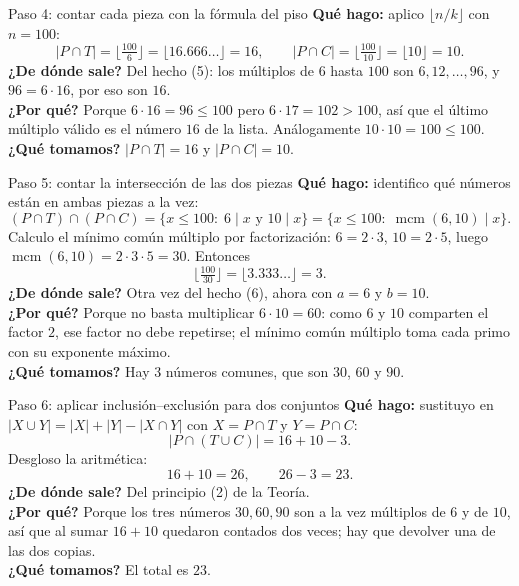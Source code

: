 \documentclass[11pt]{article}
\begin{document}
\begin{sol}
\begin{paso}{Paso 4: contar cada pieza con la f\'ormula del piso}
\textbf{Qu\'e hago:} aplico $\lfloor n/k\rfloor$ con $n=100$:
\[
|P\cap T| = \Big\lfloor \tfrac{100}{6}\Big\rfloor = \lfloor 16.666\ldots\rfloor = 16,
\qquad
|P\cap C| = \Big\lfloor \tfrac{100}{10}\Big\rfloor = \lfloor 10 \rfloor = 10.
\]
\textbf{¿De d\'onde sale?} Del hecho (5): los m\'ultiplos de $6$ hasta $100$ son $6,12,\dots,96$, y $96=6\cdot 16$, por eso son $16$.\\
\textbf{¿Por qu\'e?} Porque $6\cdot 16 = 96 \le 100$ pero $6\cdot 17 = 102 > 100$, as\'i que el \'ultimo m\'ultiplo v\'alido es el n\'umero $16$ de la lista. An\'alogamente $10\cdot 10=100\le 100$.\\
\textbf{¿Qu\'e tomamos?} $|P\cap T| = 16$ y $|P\cap C| = 10$.
\end{paso}

\begin{paso}{Paso 5: contar la intersecci\'on de las dos piezas}
\textbf{Qu\'e hago:} identifico qu\'e n\'umeros est\'an en ambas piezas a la vez:
\[
(P\cap T)\cap(P\cap C) = \{x\le 100:\; 6\mid x \text{ y } 10\mid x\} = \{x\le 100:\; \operatorname{mcm}(6,10)\mid x\}.
\]
Calculo el m\'inimo com\'un m\'ultiplo por factorizaci\'on: $6=2\cdot 3$, $10=2\cdot 5$, luego $\operatorname{mcm}(6,10)=2\cdot 3\cdot 5=30$. Entonces
\[
\Big\lfloor \tfrac{100}{30}\Big\rfloor = \lfloor 3.333\ldots\rfloor = 3.
\]
\textbf{¿De d\'onde sale?} Otra vez del hecho (6), ahora con $a=6$ y $b=10$.\\
\textbf{¿Por qu\'e?} Porque no basta multiplicar $6\cdot 10=60$: como $6$ y $10$ comparten el factor $2$, ese factor no debe repetirse; el m\'inimo com\'un m\'ultiplo toma cada primo con su exponente m\'aximo.\\
\textbf{¿Qu\'e tomamos?} Hay $3$ n\'umeros comunes, que son $30$, $60$ y $90$.
\end{paso}

\begin{paso}{Paso 6: aplicar inclusi\'on--exclusi\'on para dos conjuntos}
\textbf{Qu\'e hago:} sustituyo en $|X\cup Y| = |X|+|Y|-|X\cap Y|$ con $X=P\cap T$ y $Y=P\cap C$:
\[
\big|P\cap(T\cup C)\big| = 16 + 10 - 3.
\]
Desgloso la aritm\'etica:
\[
16 + 10 = 26, \qquad 26 - 3 = 23.
\]
\textbf{¿De d\'onde sale?} Del principio (2) de la Teor\'ia.\\
\textbf{¿Por qu\'e?} Porque los tres n\'umeros $30,60,90$ son a la vez m\'ultiplos de $6$ y de $10$, as\'i que al sumar $16+10$ quedaron contados dos veces; hay que devolver una de las dos copias.\\
\textbf{¿Qu\'e tomamos?} El total es $23$.
\end{paso}

\end{sol}
\end{document}
